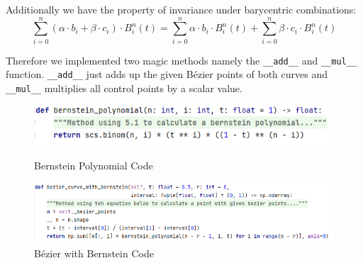 Additionally we have the property of invariance under barycentric combinations:
\[\sum_{i=0}^n (\alpha \cdot b_i + \beta \cdot c_i) \cdot B_i^n(t) = \sum_{i=0}^n \alpha \cdot b_i \cdot B_i^n(t) + \sum_{i=0}^n \beta \cdot c_i \cdot B_i^n(t)\]

Therefore we implemented two magic methods namely the \texttt{\_\_add\_\_} and \texttt{\_\_mul\_\_} function. \texttt{\_\_add\_\_} just adds up the given Bézier points of both curves and \texttt{\_\_mul\_\_} multiplies all control points by a scalar value.

\begin{figure}[H]
    \centering
    \includegraphics[width=\textwidth]{bernstein_polynomial.png}
    \caption{Bernstein Polynomial Code}
    \label{fig:my_label}
    \centering
    \includegraphics[width=\textwidth]{bernstein.png}
    \caption{Bézier with Bernstein Code}
    \label{fig:my_label}
\end{figure}
\newpage

